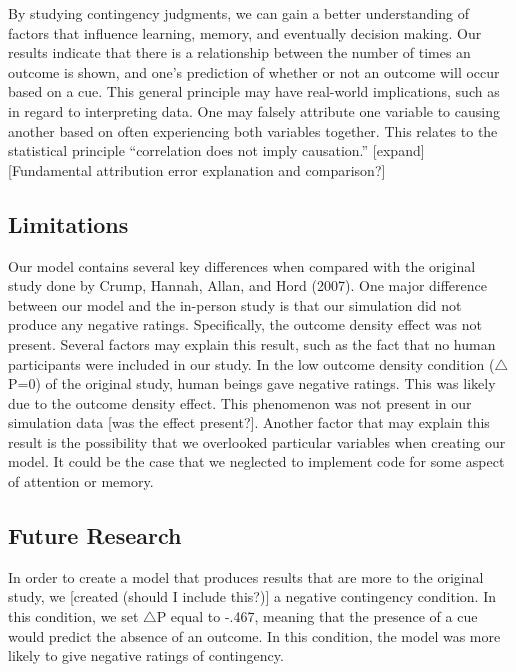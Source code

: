 \documentclass[
  english,
  man,floatsintext]{apa6}
\begin{document}
By studying contingency judgments, we can gain a better understanding of factors that influence learning, memory, and eventually decision making. Our results indicate that there is a relationship between the number of times an outcome is shown, and one's prediction of whether or not an outcome will occur based on a cue. This general principle may have real-world implications, such as in regard to interpreting data. One may falsely attribute one variable to causing another based on often experiencing both variables together. This relates to the statistical principle ``correlation does not imply causation.'' {[}expand{]}
{[}Fundamental attribution error explanation and comparison?{]}

\hypertarget{limitations}{%
\subsection{Limitations}\label{limitations}}

Our model contains several key differences when compared with the original study done by Crump, Hannah, Allan, and Hord (2007). One major difference between our model and the in-person study is that our simulation did not produce any negative ratings. Specifically, the outcome density effect was not present. Several factors may explain this result, such as the fact that no human participants were included in our study. In the low outcome density condition (\(\triangle\)P=0) of the original study, human beings gave negative ratings. This was likely due to the outcome density effect. This phenomenon was not present in our simulation data {[}was the effect present?{]}. Another factor that may explain this result is the possibility that we overlooked particular variables when creating our model. It could be the case that we neglected to implement code for some aspect of attention or memory.

\hypertarget{future-research}{%
\subsection{Future Research}\label{future-research}}

In order to create a model that produces results that are more to the original study, we {[}created (should I include this?){]} a negative contingency condition. In this condition, we set \(\triangle\)P equal to -.467, meaning that the presence of a cue would predict the absence of an outcome. In this condition, the model was more likely to give negative ratings of contingency.
\end{document}

